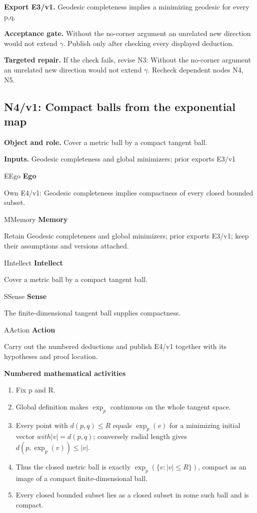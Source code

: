 \documentclass[preprint,12pt,aps,pra,showkeys,amsmath,amssymb,superscriptaddress,floatfix]{revtex4-2}
\theoremstyle{definition}
\theoremstyle{remark}
\newcommand{\mmfaculty}[3]{%
 \begin{mmfacultybox}{#1}{#2}
 {\sffamily\bfseries\color{MMBlue}#2}\par\smallskip #3
 \end{mmfacultybox}}
\newcommand{\field}[2]{\par\smallskip\noindent\textbf{#1.} #2\par}
\begin{document}
\field{Export E3/v1}{Geodesic completeness implies a minimizing geodesic for every p,q.}

\field{Acceptance gate}{Without the no-corner argument an unrelated new direction would not
extend \(\gamma\). Publish only after checking every displayed
deduction.}

\field{Targeted repair}{If the check fails, revise N3: Without the no-corner argument an
unrelated new direction would not extend \(\gamma\). Recheck dependent
nodes N4, N5.}

\clearpage

\subsection{N4/v1: Compact balls from the exponential map}

\field{Object and role}{Cover a metric ball by a compact tangent ball.}

\field{Inputs}{Geodesic completeness and global minimizers; prior exports E3/v1}

\mmfaculty{E}{Ego}{Own E4/v1: Geodesic completeness implies compactness of every closed
bounded subset.}

\mmfaculty{M}{Memory}{Retain Geodesic completeness and global minimizers; prior exports E3/v1;
keep their assumptions and versions attached.}

\mmfaculty{I}{Intellect}{Cover a metric ball by a compact tangent ball.}

\mmfaculty{S}{Sense}{The finite-dimensional tangent ball supplies compactness.}

\mmfaculty{A}{Action}{Carry out the numbered deductions and publish E4/v1 together with its
hypotheses and proof location.}

\smallskip\noindent\textbf{Numbered mathematical activities}

\begin{enumerate}[label=N4.\arabic*,leftmargin=3.4em]

\item Fix p and R.

\item Global definition makes \(\operatorname{exp} _p\) continuous on the
whole tangent space.

\item Every point with \(d(p,q)\le R\) equals \(\operatorname{exp} _p(v)\) for
a minimizing initial vector \(with|v|=d(p,q)\); conversely radial length
gives \(d(p,\operatorname{exp} _p(v))\le |v|\).

\item Thus the closed metric ball is exactly
\(\operatorname{exp} _p(\{v:|v|\le R\})\), compact as an image of a
compact finite-dimensional ball.

\item Every closed bounded subset lies as a closed subset in some such ball
and is compact.

\end{enumerate}
\end{document}
